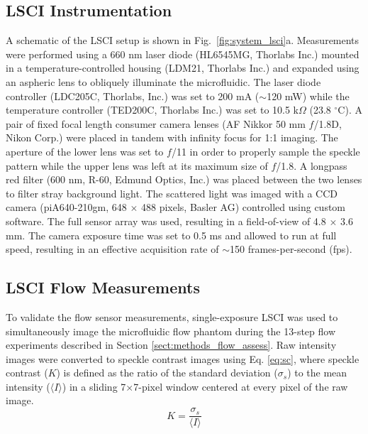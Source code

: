 \documentclass[12pt]{spieman}
\begin{document}
\begin{spacing}{2}
\subsection{LSCI Instrumentation}
\label{sect:methods_lsci_system}

A schematic of the LSCI setup is shown in Fig.~\ref{fig:system_lsci}a. Measurements were performed using a 660 nm laser diode (HL6545MG, Thorlabs Inc.) mounted in a temperature-controlled housing (LDM21, Thorlabs Inc.) and expanded using an aspheric lens to obliquely illuminate the microfluidic. The laser diode controller (LDC205C, Thorlabs, Inc.) was set to 200 mA ($\sim$120 mW) while the temperature controller (TED200C, Thorlabs Inc.) was set to 10.5 k$\Omega$ (23.8 $^\circ$C). A pair of fixed focal length consumer camera lenses (AF Nikkor 50 mm $f$/1.8D, Nikon Corp.) were placed in tandem with infinity focus for 1:1 imaging. The aperture of the lower lens was set to 
$f$/11 in order to properly sample the speckle pattern \cite{Kirkpatrick:2008ke} while the upper lens was left at its maximum size of $f$/1.8. A longpass red filter (600 nm, R-60, Edmund Optics, Inc.) was placed between the two lenses to filter stray background light. The scattered light was imaged with a CCD camera (piA640-210gm, 648 $\times$ 488 pixels, Basler AG) controlled using custom software. The full sensor array was used, resulting in a field-of-view of 4.8 $\times$ 3.6 mm. The camera exposure time was set to 0.5 ms 
and allowed to run at full speed, resulting in an effective acquisition rate of $\sim$150 frames-per-second (fps).


\subsection{LSCI Flow Measurements}
\label{sect:methods_lsci_measure}

To validate the flow sensor measurements, single-exposure LSCI was used to simultaneously image the microfluidic flow phantom during the 13-step flow experiments described in Section \ref{sect:methods_flow_assess}. Raw intensity images were converted to speckle contrast images using Eq. \ref{eq:sc}, where speckle contrast ($K$) is defined as the ratio of the standard deviation ($\sigma_{s}$) to the mean intensity ($\langle{I}\rangle$) in a sliding 7$\times$7-pixel window centered at every pixel of the raw image.
%
\begin{equation}
    \label{eq:sc}
    K = \frac{\sigma_{s}}{\langle{I}\rangle}
\end{equation}


\end{spacing}
\end{document}

